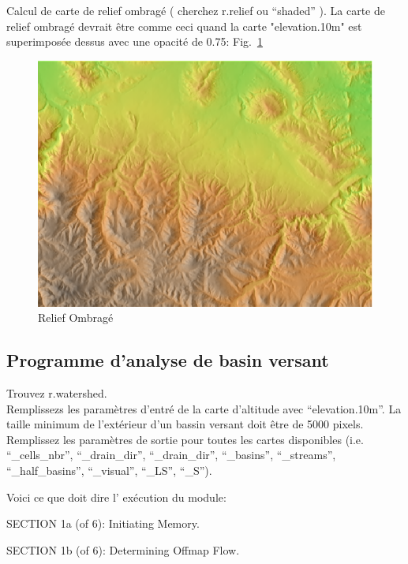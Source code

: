 Calcul de carte de relief ombrag\'e ( cherchez r.relief ou ``shaded'' ).
La carte de relief ombrag\'e devrait \^etre comme ceci quand la carte "elevation.10m" est superimpos\'ee dessus avec une opacit\'e de 0.75: Fig.~\ref{fig:grass011}

\begin{figure}[htbp]
   \centering
   \includegraphics[scale=0.35]{grass011.png}
   \caption{Relief Ombrag\'e}
   \label{fig:grass011}
\end{figure}

\subsection{Programme d'analyse de basin versant}
Trouvez r.watershed.\\
Remplissezs les param\`etres d'entr\'e de la carte d'altitude avec ``elevation.10m''. La taille minimum de l'ext\'erieur d'un bassin versant doit \^etre de 5000 pixels. Remplissez les param\`etres de sortie pour toutes les cartes disponibles (i.e. ``\_cells\_nbr'', ``\_drain\_dir'', ``\_drain\_dir'', ``\_basins'', ``\_streams'', ``\_half\_basins'', ``\_visual'', ``\_LS'', ``\_S'').

Voici ce que doit dire l' ex\'ecution du module:

SECTION 1a (of 6): Initiating Memory.

SECTION 1b (of 6): Determining Offmap Flow.

